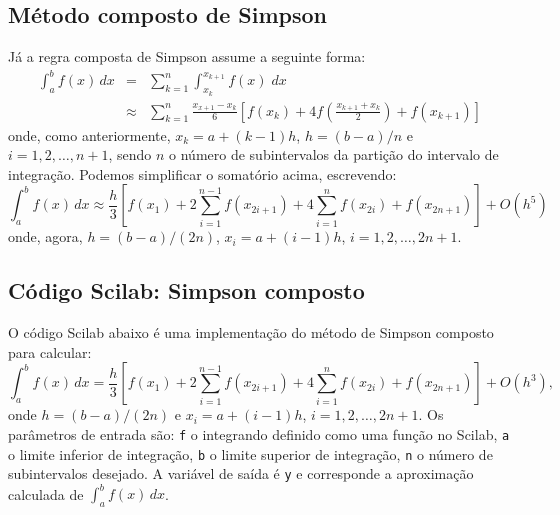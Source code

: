 \subsection{Método composto de Simpson}
Já a regra composta de Simpson assume a seguinte forma:
\begin{eqnarray*}
  \int_{a}^b f(x)\,dx &=& \sum_{k=1}^{n} \int_{x_k}^{x_{k+1}} f(x)\;dx \\
  &\approx& \sum_{k=1}^{n} \frac{x_{x+1}-x_k}{6}\left[f(x_k) + 4f\left(\frac{x_{k+1}+x_k}{2}\right)+f(x_{k+1})\right]
\end{eqnarray*}
onde, como anteriormente, $x_k = a + (k-1)h$, $h = (b-a)/n$ e $i = 1,2,\dotsc,n+1$, sendo $n$ o número de subintervalos da partição do intervalo de integração. Podemos simplificar o somatório acima, escrevendo:
\begin{equation*}
  \int_{a}^b f(x)\,dx \approx \frac{h}{3}\left[f(x_1) + 2\sum_{i=1}^{n-1} f(x_{2i+1}) + 4\sum_{i=1}^{n} f(x_{2i}) + f(x_{2n+1})\right] + O(h^5)
\end{equation*}
onde, agora, $h = (b-a)/(2n)$, $x_i = a + (i-1)h$, $i=1,2,\dotsc,2n+1$.

\ifisscilab
\subsection{Código Scilab: Simpson composto}
O código Scilab abaixo é uma implementação do método de Simpson composto para calcular:
\begin{equation*}
  \int_a^b f(x)\,dx = \frac{h}{3}\left[f(x_1) + 2\sum_{i=1}^{n-1} f(x_{2i+1}) + 4\sum_{i=1}^{n} f(x_{2i}) + f(x_{2n+1})\right] + O(h^3),
\end{equation*}
onde $h = (b-a)/(2n)$ e $x_i = a + (i-1)h$, $i=1,2,\dotsc,2n+1$. Os parâmetros de entrada são: \verb+f+ o integrando definido como uma função no Scilab, \verb+a+ o limite inferior de integração, \verb+b+ o limite superior de integração, \verb+n+ o número de subintervalos desejado. A variável de saída é \verb+y+ e corresponde a aproximação calculada de $\int_a^b f(x)\, dx$.

\fi
\ifisoctave
